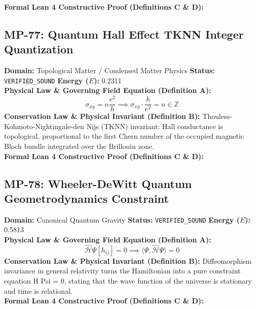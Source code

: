 \textbf{Formal Lean 4 Constructive Proof (Definitions C \& D):}


\vspace{1em}
\subsection{MP-77: Quantum Hall Effect TKNN Integer Quantization}
\textbf{Domain:} Topological Matter / Condensed Matter Physics \hfill \textbf{Status:} \texttt{VERIFIED\_SOUND} \hfill \textbf{Energy ($E$):} 0.2311\\
\textbf{Physical Law \& Governing Field Equation (Definition A):}
\begin{equation*}
\sigma_{xy} = n \frac{e^2}{h} \implies \sigma_{xy} \cdot \frac{h}{e^2} = n \in \mathbb{Z}
\end{equation*}
\textbf{Conservation Law \& Physical Invariant (Definition B):}
Thouless-Kohmoto-Nightingale-den Nijs (TKNN) invariant: Hall conductance is topological, proportional to the first Chern number of the occupied magnetic Bloch bundle integrated over the Brillouin zone.\\

\textbf{Formal Lean 4 Constructive Proof (Definitions C \& D):}


\vspace{1em}
\subsection{MP-78: Wheeler-DeWitt Quantum Geometrodynamics Constraint}
\textbf{Domain:} Canonical Quantum Gravity \hfill \textbf{Status:} \texttt{VERIFIED\_SOUND} \hfill \textbf{Energy ($E$):} 0.5813\\
\textbf{Physical Law \& Governing Field Equation (Definition A):}
\begin{equation*}
\hat{\mathcal{H}} \Psi[h_{ij}] = 0 \implies \langle \Psi, \hat{\mathcal{H}} \Psi \rangle = 0
\end{equation*}
\textbf{Conservation Law \& Physical Invariant (Definition B):}
Diffeomorphism invariance in general relativity turns the Hamiltonian into a pure constraint equation H Psi = 0, stating that the wave function of the universe is stationary and time is relational.\\

\textbf{Formal Lean 4 Constructive Proof (Definitions C \& D):}


